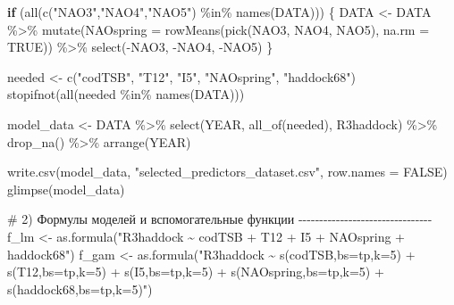 \documentclass[
  letterpaper,
  DIV=11,
  numbers=noendperiod]{scrreprt}
\newenvironment{Shaded}{\begin{snugshade}}{\end{snugshade}}
\newcommand{\AttributeTok}[1]{\textcolor[rgb]{0.40,0.45,0.13}{#1}}
\newcommand{\CommentTok}[1]{\textcolor[rgb]{0.37,0.37,0.37}{#1}}
\newcommand{\ConstantTok}[1]{\textcolor[rgb]{0.56,0.35,0.01}{#1}}
\newcommand{\ControlFlowTok}[1]{\textcolor[rgb]{0.00,0.23,0.31}{\textbf{#1}}}
\newcommand{\FunctionTok}[1]{\textcolor[rgb]{0.28,0.35,0.67}{#1}}
\newcommand{\NormalTok}[1]{\textcolor[rgb]{0.00,0.23,0.31}{#1}}
\newcommand{\OtherTok}[1]{\textcolor[rgb]{0.00,0.23,0.31}{#1}}
\newcommand{\SpecialCharTok}[1]{\textcolor[rgb]{0.37,0.37,0.37}{#1}}
\newcommand{\StringTok}[1]{\textcolor[rgb]{0.13,0.47,0.30}{#1}}
\begin{document}
\begin{Shaded}
\begin{Highlighting}[]
\ControlFlowTok{if}\NormalTok{ (}\FunctionTok{all}\NormalTok{(}\FunctionTok{c}\NormalTok{(}\StringTok{"NAO3"}\NormalTok{,}\StringTok{"NAO4"}\NormalTok{,}\StringTok{"NAO5"}\NormalTok{) }\SpecialCharTok{\%in\%} \FunctionTok{names}\NormalTok{(DATA))) \{}
\NormalTok{  DATA }\OtherTok{\textless{}{-}}\NormalTok{ DATA }\SpecialCharTok{\%\textgreater{}\%}
    \FunctionTok{mutate}\NormalTok{(}\AttributeTok{NAOspring =} \FunctionTok{rowMeans}\NormalTok{(}\FunctionTok{pick}\NormalTok{(NAO3, NAO4, NAO5), }\AttributeTok{na.rm =} \ConstantTok{TRUE}\NormalTok{)) }\SpecialCharTok{\%\textgreater{}\%}
    \FunctionTok{select}\NormalTok{(}\SpecialCharTok{{-}}\NormalTok{NAO3, }\SpecialCharTok{{-}}\NormalTok{NAO4, }\SpecialCharTok{{-}}\NormalTok{NAO5)}
\NormalTok{\}}

\NormalTok{needed }\OtherTok{\textless{}{-}} \FunctionTok{c}\NormalTok{(}\StringTok{"codTSB"}\NormalTok{, }\StringTok{"T12"}\NormalTok{, }\StringTok{"I5"}\NormalTok{, }\StringTok{"NAOspring"}\NormalTok{, }\StringTok{"haddock68"}\NormalTok{)}
\FunctionTok{stopifnot}\NormalTok{(}\FunctionTok{all}\NormalTok{(needed }\SpecialCharTok{\%in\%} \FunctionTok{names}\NormalTok{(DATA)))}

\NormalTok{model\_data }\OtherTok{\textless{}{-}}\NormalTok{ DATA }\SpecialCharTok{\%\textgreater{}\%}
  \FunctionTok{select}\NormalTok{(YEAR, }\FunctionTok{all\_of}\NormalTok{(needed), R3haddock) }\SpecialCharTok{\%\textgreater{}\%}
  \FunctionTok{drop\_na}\NormalTok{() }\SpecialCharTok{\%\textgreater{}\%}
  \FunctionTok{arrange}\NormalTok{(YEAR)}

\FunctionTok{write.csv}\NormalTok{(model\_data, }\StringTok{"selected\_predictors\_dataset.csv"}\NormalTok{, }\AttributeTok{row.names =} \ConstantTok{FALSE}\NormalTok{)}
\FunctionTok{glimpse}\NormalTok{(model\_data)}


\CommentTok{\# 2) Формулы моделей и вспомогательные функции {-}{-}{-}{-}{-}{-}{-}{-}{-}{-}{-}{-}{-}{-}{-}{-}{-}{-}{-}{-}{-}{-}{-}{-}{-}{-}{-}{-}{-}{-}{-}{-}}
\NormalTok{f\_lm  }\OtherTok{\textless{}{-}} \FunctionTok{as.formula}\NormalTok{(}\StringTok{"R3haddock \textasciitilde{} codTSB + T12 + I5 + NAOspring + haddock68"}\NormalTok{)}
\NormalTok{f\_gam }\OtherTok{\textless{}{-}} \FunctionTok{as.formula}\NormalTok{(}\StringTok{"R3haddock \textasciitilde{} s(codTSB,bs=\textquotesingle{}tp\textquotesingle{},k=5) + s(T12,bs=\textquotesingle{}tp\textquotesingle{},k=5) + s(I5,bs=\textquotesingle{}tp\textquotesingle{},k=5) + s(NAOspring,bs=\textquotesingle{}tp\textquotesingle{},k=5) + s(haddock68,bs=\textquotesingle{}tp\textquotesingle{},k=5)"}\NormalTok{)}


\end{Highlighting}
\end{Shaded}
\end{document}
